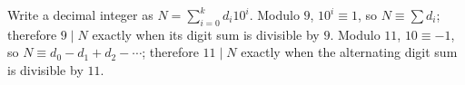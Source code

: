 Write a decimal integer as $N=\sum_{i=0}^kd_i10^i$. Modulo $9$, $10^i\equiv1$, so $N\equiv\sum d_i$; therefore $9\mid N$ exactly when its digit sum is divisible by $9$. Modulo $11$, $10\equiv-1$, so $N\equiv d_0-d_1+d_2-\cdots$; therefore $11\mid N$ exactly when the alternating digit sum is divisible by $11$.
